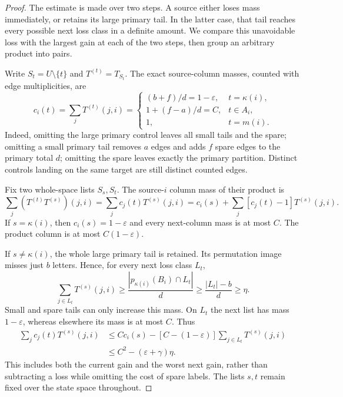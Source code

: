 \documentclass[11pt,reqno]{amsart}
\numberwithin{equation}{section}
\theoremstyle{definition}
\theoremstyle{definition}
\newcommand{\eps}{\varepsilon}
\begin{document}
\begin{proof}
The estimate is made over two steps. A source either loses mass
immediately, or retains its large primary tail. In the latter case,
that tail reaches every possible next loss class in a definite
amount. We compare this unavoidable loss with the largest gain at
each of the two steps, then group an arbitrary product into pairs.

Write $S_t=U\setminus\{t\}$ and $T^{(t)}=T_{S_t}$.
The exact source-column masses, counted with edge multiplicities,
are
\begin{equation}\label{eq:gain-columns}
 c_i(t)=\sum_jT^{(t)}(j,i)=
 \begin{cases}
 (b+f)/d=1-\eps,&t=\kappa(i),\\
 1+(f-a)/d=C,&t\in A_i,\\
 1,&t=m(i).
 \end{cases}
\end{equation}
Indeed, omitting the large primary control leaves all small tails
and the spare; omitting a small primary tail removes $a$ edges
and adds $f$ spare edges to the primary total $d$; omitting the
spare leaves exactly the primary partition. Distinct controls landing
on the same target are still distinct counted edges.

Fix two whole-space lists $S_s,S_t$. The source-$i$ column mass
of their product is
\begin{equation}\label{eq:gain-identity}
 \sum_j(T^{(t)}T^{(s)})(j,i)
 =\sum_jc_j(t)T^{(s)}(j,i)
 =c_i(s)+\sum_j[c_j(t)-1]T^{(s)}(j,i).
\end{equation}
If $s=\kappa(i)$, then $c_i(s)=1-\eps$ and every next-column
mass is at most $C$. The product column is at most $C(1-\eps)$.

If $s\ne\kappa(i)$, the whole large primary tail is retained.
Its permutation image misses just $b$ letters. Hence, for every
next loss class $L_t$,
\begin{equation}\label{eq:gain-landing}
 \sum_{j\in L_t}T^{(s)}(j,i)
 \ge\frac{|p_{\kappa(i)}(B_i)\cap L_t|}{d}
 \ge\frac{|L_t|-b}{d}\ge\eta.
\end{equation}
Small and spare tails can only increase this mass. On $L_t$ the
next list has mass $1-\eps$, whereas elsewhere its mass is at
most $C$. Thus
\begin{align}
 \sum_jc_j(t)T^{(s)}(j,i)
 &\le Cc_i(s)-[C-(1-\eps)]
             \sum_{j\in L_t}T^{(s)}(j,i)\nonumber\\
 &\le C^2-(\eps+\gamma)\eta.
 \label{eq:gain-pair}
\end{align}
This includes both the current gain and the worst next gain, rather
than subtracting a loss while omitting the cost of spare labels.
The lists $s,t$ remain fixed over the state space throughout.


\end{proof}
\end{document}
